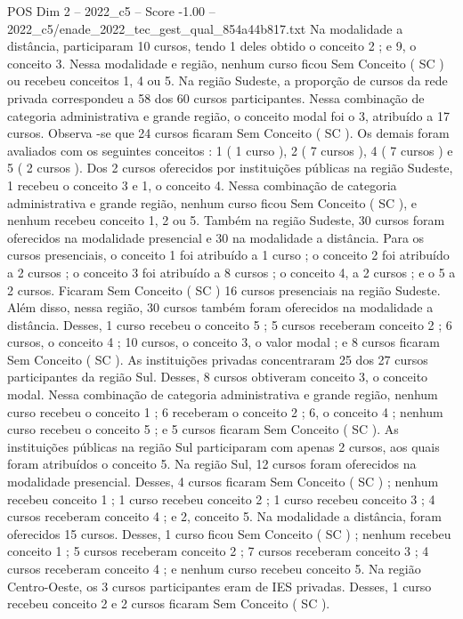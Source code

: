 \begin{textsample}{POS Dim 2 – 2022\_c5 – Score -1.00 – 2022\_c5/enade\_2022\_tec\_gest\_qual\_854a44b817.txt}
Na modalidade a distância, participaram 10 cursos, tendo 1 deles obtido o conceito 2 ; e 9, o conceito 3.
Nessa modalidade e região, nenhum curso ficou Sem Conceito ( SC ) ou recebeu conceitos 1, 4 ou 5.
Na região Sudeste, a proporção de cursos da rede privada correspondeu a 58 dos 60 cursos participantes.
Nessa combinação de categoria administrativa e grande região, o conceito modal foi o 3, atribuído a 17 cursos.
Observa -se que 24 cursos ficaram Sem Conceito ( SC ).
Os demais foram avaliados com os seguintes conceitos : 1 ( 1 curso ), 2 ( 7 cursos ), 4 ( 7 cursos ) e 5 ( 2 cursos ).
Dos 2 cursos oferecidos por instituições públicas na região Sudeste, 1 recebeu o conceito 3 e 1, o conceito 4.
Nessa combinação de categoria administrativa e grande região, nenhum curso ficou Sem Conceito ( SC ), e nenhum recebeu conceito 1, 2 ou 5.
Também na região Sudeste, 30 cursos foram oferecidos na modalidade presencial e 30 na modalidade a distância.
Para os cursos presenciais, o conceito 1 foi atribuído a 1 curso ; o conceito 2 foi atribuído a 2 cursos ; o conceito 3 foi atribuído a 8 cursos ; o conceito 4, a 2 cursos ; e o 5 a 2 cursos.
Ficaram Sem Conceito ( SC ) 16 cursos presenciais na região Sudeste.
Além disso, nessa região, 30 cursos também foram oferecidos na modalidade a distância.
Desses, 1 curso recebeu o conceito 5 ; 5 cursos receberam conceito 2 ; 6 cursos, o conceito 4 ; 10 cursos, o conceito 3, o valor modal ; e 8 cursos ficaram Sem Conceito ( SC ).
As instituições privadas concentraram 25 dos 27 cursos participantes da região Sul.
Desses, 8 cursos obtiveram conceito 3, o conceito modal.
Nessa combinação de categoria administrativa e grande região, nenhum curso recebeu o conceito 1 ; 6 receberam o conceito 2 ; 6, o conceito 4 ; nenhum curso recebeu o conceito 5 ; e 5 cursos ficaram Sem Conceito ( SC ).
As instituições públicas na região Sul participaram com apenas 2 cursos, aos quais foram atribuídos o conceito 5.
Na região Sul, 12 cursos foram oferecidos na modalidade presencial.
Desses, 4 cursos ficaram Sem Conceito ( SC ) ; nenhum recebeu conceito 1 ; 1 curso recebeu conceito 2 ; 1 curso recebeu conceito 3 ; 4 cursos receberam conceito 4 ; e 2, conceito 5.
Na modalidade a distância, foram oferecidos 15 cursos.
Desses, 1 curso ficou Sem Conceito ( SC ) ; nenhum recebeu conceito 1 ; 5 cursos receberam conceito 2 ; 7 cursos receberam conceito 3 ; 4 cursos receberam conceito 4 ; e nenhum curso recebeu conceito 5.
Na região Centro-Oeste, os 3 cursos participantes eram de IES privadas.
Desses, 1 curso recebeu conceito 2 e 2 cursos ficaram Sem Conceito ( SC ).

\end{textsample}
